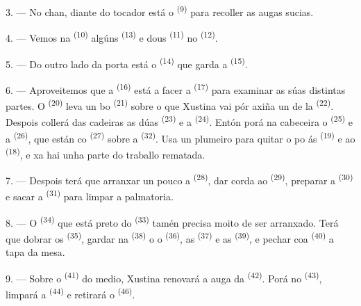 3. --- No chan, diante do tocador está o  \textsuperscript{(9)} para recoller as
augas sucias.

4. --- Vemos na  \textsuperscript{(10)} algúns
 \textsuperscript{(13)} e dous 
\textsuperscript{(11)} no  \textsuperscript{(12)}.

5. --- Do outro lado da porta está o  \textsuperscript{(14)} que
garda a  \textsuperscript{(15)}.

6. --- Aproveitemos que a  \textsuperscript{(16)} está a facer a
 \textsuperscript{(17)} para examinar as súas distintas partes. O
 \textsuperscript{(20)} leva un bo  \textsuperscript{(21)} sobre o que Xustina vai pór axiña un
 de la \textsuperscript{(22)}. Despois collerá das cadeiras as dúas
 \textsuperscript{(23)} e a  \textsuperscript{(24)}.
Entón porá na cabeceira o  \textsuperscript{(25)} e a
 \textsuperscript{(26)}, que están co 
\textsuperscript{(27)} sobre a  \textsuperscript{(32)}. Usa un plumeiro para
quitar o po ás  \textsuperscript{(19)} e ao
 \textsuperscript{(18)}, e xa hai unha parte do traballo rematada.

7. --- Despois terá que arranxar un pouco a  \textsuperscript{(28)},
dar corda ao  \textsuperscript{(29)}, preparar a
 \textsuperscript{(30)} e sacar a
 \textsuperscript{(31)} para limpar a palmatoria.

\VUsaut{5.0mm}
\VUsaut{3.0mm}

8. --- O  \textsuperscript{(34)} que está preto do
 \textsuperscript{(33)} tamén precisa moito de ser arranxado. Terá que
dobrar os  \textsuperscript{(35)}, gardar na 
\textsuperscript{(38)} o  o  \textsuperscript{(36)}, as
 \textsuperscript{(37)} e as 
\textsuperscript{(39)}, e pechar coa  \textsuperscript{(40)} a tapa da mesa.

9. --- Sobre o  \textsuperscript{(41)} do medio, Xustina renovará a auga da
 \textsuperscript{(42)}. Porá  no
 \textsuperscript{(43)}, limpará a 
\textsuperscript{(44)} e retirará o  \textsuperscript{(46)}.

